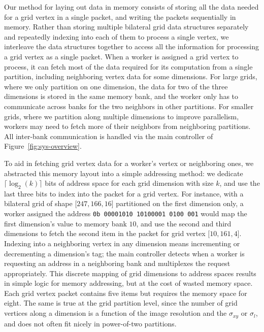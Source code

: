 Our method for laying out data in memory consists of storing all the data needed for a grid vertex in a single packet, and writing the packets sequentially in memory.
Rather than storing multiple bilateral grid data structures separately and repeatedly indexing into each of them to process a single vertex, we interleave the data structures together to access all the information for processing a grid vertex as a single packet.
When a worker is assigned a grid vertex to process, it can fetch most of the data required for its computation from a single partition, including neighboring vertex data for some dimensions.
For large grids, where we only partition on one dimension, the data for two of the three dimensions is stored in the same memory bank, and the worker only has to communicate across banks for the two neighbors in other partitions.
For smaller grids, where we partition along multiple dimensions to improve parallelism, workers may need to fetch more of their neighbors from neighboring partitions.
All inter-bank communication is handled via the main controller of Figure~\ref{fig:sys-overview}.

To aid in fetching grid vertex data for a worker's vertex or neighboring ones, we abstracted this memory layout into a simple addressing method: we dedicate $\lceil\log_2(k)\rceil$ bits of address space for each grid dimension with size  $k$, and use the last three bits to index into the packet for a grid vertex.
For instance, with a bilateral grid of shape $\big[ 247, 166, 16\big]$ partitioned on the first dimension only, a worker assigned the address \texttt{0b 00001010 10100001 0100 001} would map the first dimension's value to memory bank $10$, and use the second and third dimensions to fetch the second item in the packet for grid vertex $\big[ 10, 161, 4\big]$.
Indexing into a neighboring vertex in any dimension means incrementing or decrementing a dimension's tag; the main controller detects when a worker is requesting an address in a neighboring bank and multiplexes the request appropriately.
This discrete mapping of grid dimensions to address spaces results in simple logic for memory addressing, but at the cost of wasted memory space.
Each grid vertex packet contains five items but requires the memory space for eight.
The same is true at the grid partition level, since the number of grid vertices along a dimension is a function of the image resolution and the $\sigma_{xy}$ or $\sigma_{l}$, and does not often fit nicely in power-of-two partitions.



